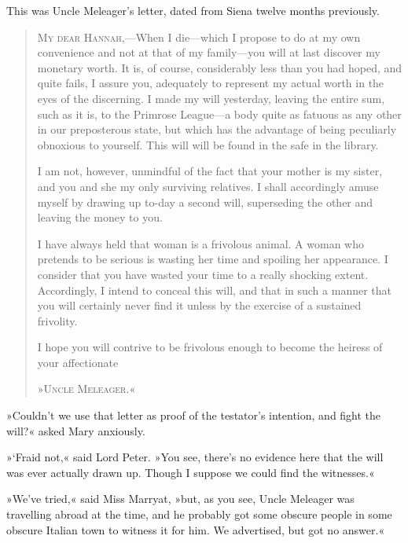 This was Uncle Meleager's letter, dated from Siena twelve months previously.

\makeatletter
{}
{%

}{%
	\enlargethispage{\baselineskip}
}
\makeatother

\begin{quotation}
\textsc{My dear Hannah,}—When I die—which I propose to do at my own convenience and not at that of my family—you will at last discover my monetary worth. It is, of course, considerably less than you had hoped, and quite fails, I assure you, adequately to represent my actual worth in the eyes of the discerning. I made my will yesterday, leaving the entire sum, such as it is, to the Primrose League—a body quite as fatuous as any other in our preposterous state, but which has the advantage of being peculiarly obnoxious to yourself. This will will be found in the safe in the library.

I am not, however, unmindful of the fact that your mother is my sister, and you and she my only surviving relatives. I shall accordingly amuse myself by drawing up to-day a second will, superseding the other and leaving the money to you.

I have always held that woman is a frivolous animal. A woman who pretends to be serious is wasting her time and spoiling her appearance. I consider that you have wasted your time to a really shocking extent. Accordingly, I intend to conceal this will, and that in such a manner that you will certainly never find it unless by the exercise of a sustained frivolity.

I hope you will contrive to be frivolous enough to become the heiress of your affectionate
\begin{flushright}
»\textsc{Uncle Meleager.}«
\end{flushright}
\end{quotation}

»Couldn't we use that letter as proof of the testator's intention, and fight the will?« asked Mary anxiously.

»`Fraid not,« said Lord Peter. »You see, there's no evidence here that the will was ever actually drawn up. Though I suppose we could find the witnesses.«

»We've tried,« said Miss Marryat, »but, as you see, Uncle Meleager was travelling abroad at the time, and he probably got some obscure people in some obscure Italian town to witness it for him. We advertised, but got no answer.«

